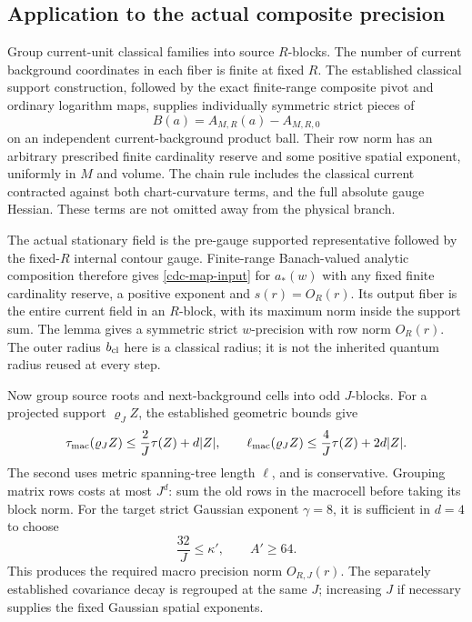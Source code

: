 \documentclass[11pt]{article}
\theoremstyle{remark}
\begin{document}
\subsection{Application to the actual composite precision}
\label{cdc-actual-precision-section}

Group current-unit classical families into source $R$-blocks.
The number of current background coordinates in each fiber is
finite at fixed $R$. The established classical support
construction, followed by the exact finite-range composite pivot
and ordinary logarithm maps, supplies individually symmetric
strict pieces of
\begin{equation}
 B(a)=A_{M,R}(a)-A_{M,R,0}
 \label{cdc-actual-precision}
\end{equation}
on an independent current-background product ball. Their row
norm has an arbitrary prescribed finite cardinality reserve and
some positive spatial exponent, uniformly in $M$ and volume.
The chain rule includes the classical current contracted against
both chart-curvature terms, and the full absolute gauge Hessian.
These terms are not omitted away from the physical branch.

The actual stationary field is the pre-gauge supported
representative followed by the fixed-$R$ internal contour gauge.
Finite-range Banach-valued analytic composition therefore gives
\eqref{cdc-map-input} for $a_*(w)$ with any fixed finite
cardinality reserve, a positive exponent and $s(r)=O_R(r)$.
Its output fiber is the entire current field in an $R$-block,
with its maximum norm inside the support sum. The lemma gives
a symmetric strict $w$-precision with row norm $O_R(r)$.
The outer radius $b_{\rm cl}$ here is a classical radius; it is
not the inherited quantum radius reused at every step.

Now group source roots and next-background cells into odd
$J$-blocks. For a projected support $\varrho_J Z$, the established
geometric bounds give
\begin{equation}
 \tau_{\rm mac}(\varrho_JZ)
       \leq\frac2J\tau(Z)+d|Z|,\qquad
 \ell_{\rm mac}(\varrho_JZ)
       \leq\frac4J\tau(Z)+2d|Z|.
 \label{cdc-projection}
\end{equation}
The second uses metric spanning-tree length $\ell$, and is
conservative. Grouping matrix rows costs at most $J^d$:
sum the old rows in the macrocell before taking its block norm.
For the target strict Gaussian exponent $\gamma=8$, it is
sufficient in $d=4$ to choose
\begin{equation}
 \frac{32}{J}\leq\kappa',\qquad A'\geq64.
 \label{cdc-precision-reserve}
\end{equation}
This produces the required macro precision norm $O_{R,J}(r)$.
The separately established covariance decay is regrouped at the
same $J$; increasing $J$ if necessary supplies the fixed
Gaussian spatial exponents.
\end{document}
